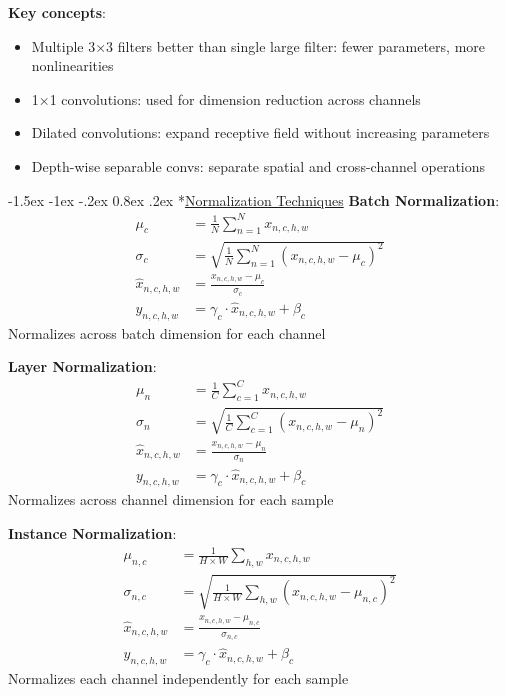 \documentclass{article}
\makeatletter
\renewcommand\section{\@startsection{section}{1}{\z@}%
                                  {-1.5ex \@plus -1ex \@minus -.2ex}%
                                  {0.8ex \@plus.2ex}%
                                  {\normalfont\small\bfseries}}
\makeatother
\begin{document}
\begin{multicols}{3}
\textbf{Key concepts}:
\begin{itemize}
\item Multiple 3×3 filters better than single large filter: fewer parameters, more nonlinearities
\item 1×1 convolutions: used for dimension reduction across channels
\item Dilated convolutions: expand receptive field without increasing parameters
\item Depth-wise separable convs: separate spatial and cross-channel operations
\end{itemize}

\section*{\underline{Normalization Techniques}}
\textbf{Batch Normalization}:
\begin{align*}
\mu_c &= \frac{1}{N} \sum_{n=1}^{N} x_{n,c,h,w}\\
\sigma_c &= \sqrt{\frac{1}{N} \sum_{n=1}^{N} (x_{n,c,h,w} - \mu_c)^2}\\
\hat{x}_{n,c,h,w} &= \frac{x_{n,c,h,w} - \mu_c}{\sigma_c}\\
y_{n,c,h,w} &= \gamma_c \cdot \hat{x}_{n,c,h,w} + \beta_c
\end{align*}
Normalizes across batch dimension for each channel

\textbf{Layer Normalization}:
\begin{align*}
\mu_n &= \frac{1}{C} \sum_{c=1}^{C} x_{n,c,h,w}\\
\sigma_n &= \sqrt{\frac{1}{C} \sum_{c=1}^{C} (x_{n,c,h,w} - \mu_n)^2}\\
\hat{x}_{n,c,h,w} &= \frac{x_{n,c,h,w} - \mu_n}{\sigma_n}\\
y_{n,c,h,w} &= \gamma_c \cdot \hat{x}_{n,c,h,w} + \beta_c
\end{align*}
Normalizes across channel dimension for each sample

\textbf{Instance Normalization}:
\begin{align*}
\mu_{n,c} &= \frac{1}{H \times W} \sum_{h,w} x_{n,c,h,w}\\
\sigma_{n,c} &= \sqrt{\frac{1}{H \times W} \sum_{h,w} (x_{n,c,h,w} - \mu_{n,c})^2}\\
\hat{x}_{n,c,h,w} &= \frac{x_{n,c,h,w} - \mu_{n,c}}{\sigma_{n,c}}\\
y_{n,c,h,w} &= \gamma_c \cdot \hat{x}_{n,c,h,w} + \beta_c
\end{align*}
Normalizes each channel independently for each sample


\end{multicols}
\end{document}
